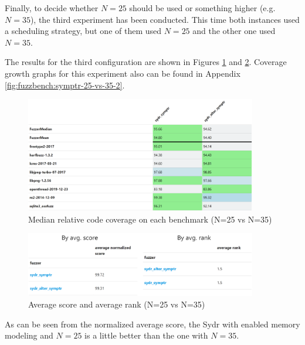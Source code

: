 
Finally, to decide whether $ N = 25 $ should be used or something higher (e.g. $ N = 35 $), the third experiment has been conducted. This time both instances used a scheduling strategy, but one of them used $ N = 25 $ and the other one used $ N = 35 $.

The results for the third configuration are shown in Figures \ref{fig:fuzzbench-symptr-25-vs-35-2-coverage} and \ref{fig:fuzzbench-symptr-25-vs-35-2-score-rank}. Coverage growth graphs for this experiment also can be found in Appendix \ref{fig:fuzzbench:symptr-25-vs-35-2}.

\begin{figure}[h]
    \centering
    \includegraphics[width=0.9\textwidth]{assets/fuzzbench/symptr-25-vs-35-2/median-relative-code-coverage-on-each-benchmark.png}
    \caption{Median relative code coverage on each benchmark (N=25 vs N=35)}
    \label{fig:fuzzbench-symptr-25-vs-35-2-coverage}
\end{figure}

\begin{figure}[h]
    \centering
    \includegraphics[width=0.9\textwidth]{assets/fuzzbench/symptr-25-vs-35-2/avg-score-avg-rank.png}
    \caption{Average score and average rank (N=25 vs N=35)}
    \label{fig:fuzzbench-symptr-25-vs-35-2-score-rank}
\end{figure}

As can be seen from the normalized average score, the Sydr with enabled memory modeling and $N=25$ is a little better than the one with $N=35$.

